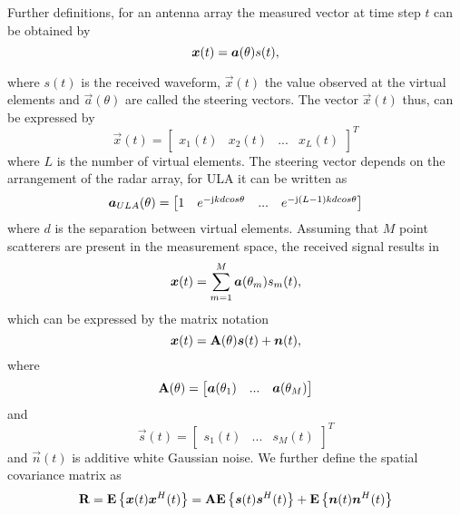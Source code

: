 Further definitions, for an antenna array the measured vector at time step $t$ can be obtained by
\begin{equation}
	\vec{x}(t) = \vec{a}(\theta){s}(t)\\,
\end{equation}

where ${s}(t)$ is the received waveform, $\vec{x}(t)$ the value observed at the virtual elements and $\vec{a}(\theta)$ are called the steering vectors. The vector $\vec{x}(t)$ thus, can be expressed by 
\begin{equation}
	\vec{x}(t) = \begin{bmatrix}
	x_1(t) & x_2(t) &... & x_L(t)
	\end{bmatrix}^T
\end{equation}
where $L$ is the number of virtual elements. The steering vector depends on the arrangement of the radar array, for ULA it can be written as
\begin{equation}
	\vec{a}_{ULA}(\theta) = \begin{bmatrix}
	1 & e^{-\mj kd cos \theta} & ... & e^{-\mj(L-1) kd cos \theta} 
	\end{bmatrix} 
\end{equation}
where $d$ is the separation between virtual elements. Assuming that $M$ point scatterers are present in the measurement space, the received signal results in
\begin{equation}
	\vec{x}(t) = \sum_{m=1}^{M}\vec{a}(\theta_m)s_m(t)\\,
\end{equation}
which can be expressed by the matrix notation 
\begin{equation}
	\vec{x}(t) = \matrix{A}(\theta) \vec{s}(t) + \vec{n}(t)\\,
\end{equation}
where 
\begin{equation}
	\matrix{A}(\theta) = \begin{bmatrix}
	\vec{a}(\theta_1) & ... & \vec{a}(\theta_M)
	\end{bmatrix}
\end{equation}
and
\begin{equation}
\vec{s}(t) = \begin{bmatrix}
s_1(t) & ... & s_M(t)
\end{bmatrix}^T
\end{equation}
and $\vec{n}(t)$ is additive white Gaussian noise.  We further define the spatial covariance matrix as
\begin{equation}
\matrix{R} = \Expc\left\{\vec{x}(t)\vec{x}^H(t) \right\} = \matrix{A}\Expc\left\{\vec{s}(t)\vec{s}^H(t)\right\}+ \Expc \left\{\vec{n}(t)\vec{n}^H (t)\right\}
\end{equation}
